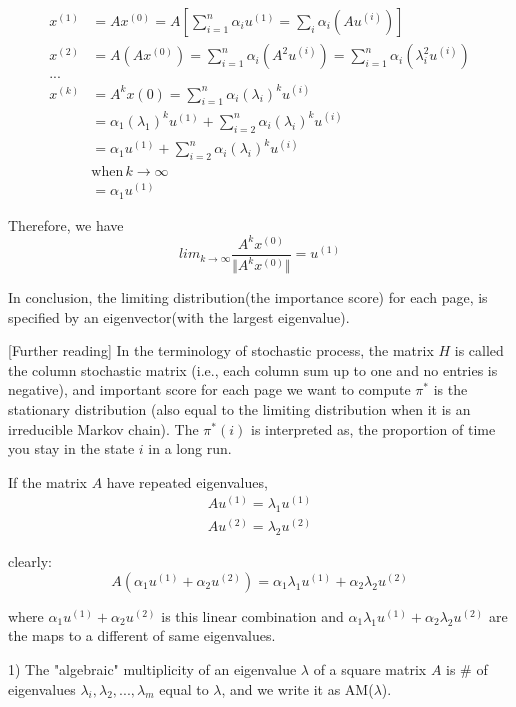 \begin{align*}
x^{(1)} &= Ax^{(0)} = A[\sum^n_{i=1}\alpha_iu^{(1)} = \sum_i\alpha_i(Au^{(i)})]\\
x^{(2)} &= A(Ax^{(0)}) = \sum^n_{i=1}\alpha_i(A^2u^{(i)}) = \sum^n_{i=1}\alpha_i(\lambda_i^2u^{(i)})\\
...\\
x^{(k)} &= A^kx{(0)} = \sum^n_{i=1}\alpha_i(\lambda_i)^ku^{(i)}\\
&= \alpha_1(\lambda_1)^ku^{(1)} + \sum^n_{i=2}\alpha_i(\lambda_i)^ku^{(i)} \\
&= \alpha_1u^{(1)} + \sum^n_{i=2}\alpha_i(\lambda_i)^ku^{(i)}\\
&\text{when} \,k \rightarrow \infty\\
&= \alpha_1u^{(1)}
\end{align*}

Therefore, we have
$$lim_{k\rightarrow \infty}\frac{A^kx^{(0)}}{\Vert A^kx^{(0)}\Vert} =u^{(1)}$$

In conclusion, the limiting distribution(the importance score) for each page, is specified by an eigenvector(with the largest eigenvalue).

[Further reading] In the terminology of stochastic process, the matrix $H$ is called the column stochastic matrix (i.e., each column sum up to one and no entries is negative), and important score for each page we want to compute $\pi^*$ is the stationary distribution (also equal to the limiting distribution when it is an irreducible Markov chain). The $\pi^*(i)$ is interpreted as, the proportion of time you stay in the state $i$ in a long run. 



If the matrix $A$ have repeated eigenvalues, 
\begin{align*}
Au^{(1)} =\lambda_1u^{(1)}\\
Au^{(2)} =\lambda_2u^{(2)}
\end{align*}

clearly:
\begin{equation*}
A(\alpha_1u^{(1)} + \alpha_2u^{(2)}) = \alpha_1\lambda_1u^{(1)} + \alpha_2\lambda_2u^{(2)}
\end{equation*}

where $\alpha_1u^{(1)} + \alpha_2u^{(2)}$ is this linear combination and $\alpha_1\lambda_1u^{(1)} + \alpha_2\lambda_2u^{(2)}$ are the maps to a different of same eigenvalues.

1) The "algebraic" multiplicity of an eigenvalue $\lambda$ of a square matrix $A$ is \# of eigenvalues $\lambda_i, \lambda_2,...,\lambda_m$ equal to $\lambda$, and we write it as AM($\lambda$).

